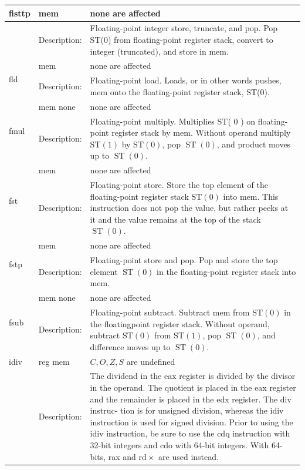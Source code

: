 \documentclass[10pt]{book}
\begin{document}
\begin{center}
\begin{tabular}{|l|l|l|}
\hline
\multirow[t]{2}{*}{fisttp} & mem & none are affected \\
\hline
 & Description: & Floating-point integer store, truncate, and pop. Pop ST(0) from floating-point register stack, convert to integer (truncated), and store in mem. \\
\hline
\multirow[t]{2}{*}{fld} & mem & none are affected \\
\hline
 & Description: & Floating-point load. Loads, or in other words pushes, mem onto the floating-point register stack, ST(0). \\
\hline
\multirow[t]{2}{*}{fmul} & mem none & none are affected \\
\hline
 & Description: & Floating-point multiply. Multiplies ST( 0 ) on floating-point register stack by mem. Without operand multiply $\mathrm{ST}(1)$ by $\mathrm{ST}(0)$, pop $\operatorname{ST}(0)$, and product moves up to $\operatorname{ST}(0)$. \\
\hline
\multirow[t]{2}{*}{fst} & mem & none are affected \\
\hline
 & Description: & Floating-point store. Store the top element of the floating-point register stack $\mathrm{ST}(0)$ into mem. This instruction does not pop the value, but rather peeks at it and the value remains at the top of the stack $\operatorname{ST}(0)$. \\
\hline
\multirow[t]{2}{*}{fstp} & mem & none are affected \\
\hline
 & Description: & Floating-point store and pop. Pop and store the top element $\operatorname{ST}(0)$ in the floating-point register stack into mem. \\
\hline
\multirow[t]{2}{*}{fsub} & mem none & none are affected \\
\hline
 & Description: & Floating-point subtract. Subtract mem from $\mathrm{ST}(0)$ in the floatingpoint register stack. Without operand, subtract $\mathrm{ST}(0)$ from $\mathrm{ST}(1)$, pop $\operatorname{ST}(0)$, and difference moves up to $\operatorname{ST}(0)$. \\
\hline
idiv & reg mem & $C, O, Z, S$ are undefined \\
\hline
 & Description: & The dividend in the eax register is divided by the divisor in the operand. The quotient is placed in the eax register and the remainder is placed in the edx register. The div instruc- tion is for unsigned division, whereas the idiv instruction is used for signed division. Prior to using the idiv instruction, be sure to use the cdq instruction with 32-bit integers and cdo with 64-bit integers. With 64-bits, rax and $\mathrm{rd} \times$ are used instead. \\
\hline
\end{tabular}
\end{center}
\end{document}
